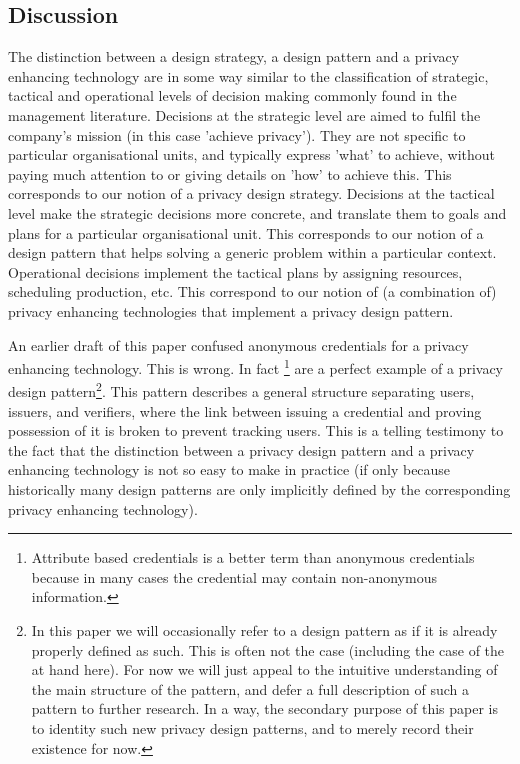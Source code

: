 \subsection{Discussion}

The distinction between a design strategy, a design pattern and a privacy enhancing technology are in some way similar to the classification of strategic, tactical and operational levels of decision making commonly found in the management literature. Decisions at the strategic level are aimed to fulfil the company's mission (in this case 'achieve privacy'). They are not specific to particular organisational units, and typically express 'what' to achieve, without paying much attention to or giving details on 'how' to achieve this. This corresponds to our notion of a privacy design strategy.
Decisions at the tactical level make the strategic decisions more concrete, and translate them to goals and plans for a particular organisational unit. This corresponds to our notion of a design pattern that helps solving a generic problem within a particular context. Operational decisions implement the tactical plans by assigning resources, scheduling production, etc. This
correspond to our notion of (a combination of) privacy enhancing technologies that implement a privacy design pattern.

An earlier draft of this paper confused anonymous credentials for a privacy enhancing technology. This is wrong. In fact \footnote{Attribute based credentials is a better term than anonymous credentials
  because in many cases the credential may contain non-anonymous information. 
}
are a perfect example of a privacy design pattern\footnote{In this paper we will occasionally refer to a design pattern as if it is
  already properly defined as such. This is often not the case (including the
  case of the  at hand here). For now we 
  will just appeal to the intuitive understanding of the main structure of the
  pattern, and defer a full description of such a pattern to further research.
  In a way, the secondary purpose of this paper is to identity such new privacy
  design patterns, and to merely record their existence for now.
}. 
This pattern describes a general structure separating users, issuers, and verifiers, where the link between issuing a credential and proving possession of it is broken to prevent tracking users. This is a telling testimony to the fact that the distinction between a privacy design pattern and a privacy enhancing technology is not so easy to make in practice (if only because historically many design patterns are only implicitly defined by the corresponding privacy enhancing technology).

